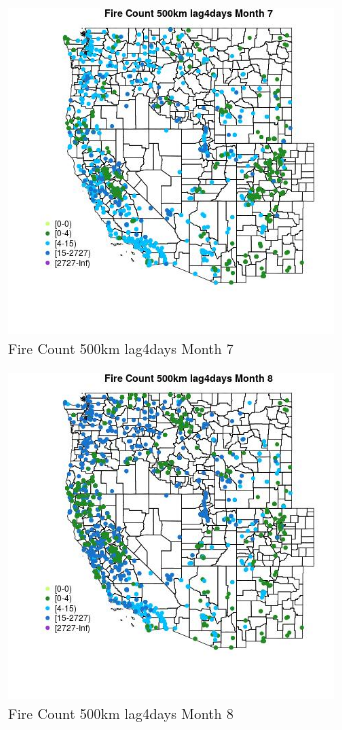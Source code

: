 \begin{figure} 
\centering  
\includegraphics[width=0.77\textwidth]{Code_Outputs/Report_ML_input_PM25_Step4_part_f_de_duplicated_aveswNAs_MapObsMo7Fire_Count_500km_lag4days.jpg} 
\caption{\label{fig:Report_ML_input_PM25_Step4_part_f_de_duplicated_aveswNAsMapObsMo7Fire_Count_500km_lag4days}Fire Count 500km lag4days Month 7} 
\end{figure} 
 

\begin{figure} 
\centering  
\includegraphics[width=0.77\textwidth]{Code_Outputs/Report_ML_input_PM25_Step4_part_f_de_duplicated_aveswNAs_MapObsMo8Fire_Count_500km_lag4days.jpg} 
\caption{\label{fig:Report_ML_input_PM25_Step4_part_f_de_duplicated_aveswNAsMapObsMo8Fire_Count_500km_lag4days}Fire Count 500km lag4days Month 8} 
\end{figure} 
 

